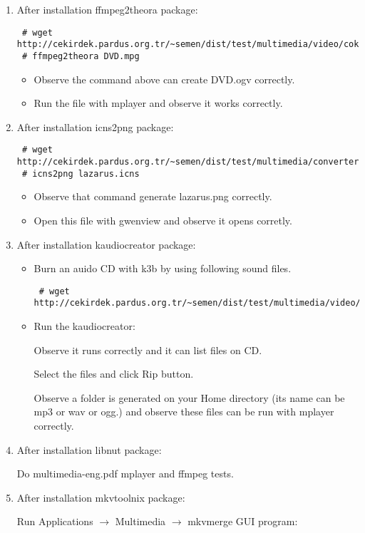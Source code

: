 \documentclass[a4paper,10pt]{article}
\begin{document}
\begin{enumerate}
\item After installation ffmpeg2theora package:
\begin{verbatim}
 # wget http://cekirdek.pardus.org.tr/~semen/dist/test/multimedia/video/cokluortam/DVD.mpg
 # ffmpeg2theora DVD.mpg
\end{verbatim}
\begin{itemize}
 \item Observe the command above can create DVD.ogv correctly.
 \item Run the file with mplayer and observe it works correctly.
\end{itemize}
\item After installation icns2png package:
\begin{verbatim}
 # wget http://cekirdek.pardus.org.tr/~semen/dist/test/multimedia/converter/lazarus.png
 # icns2png lazarus.icns
\end{verbatim}
\begin{itemize}
 \item Observe that command generate lazarus.png correctly.
 \item Open this file with gwenview and observe it opens corretly.
\end{itemize}
\item After installation kaudiocreator package:
\begin{itemize}
 \item Burn an auido CD with k3b by using following sound files.
\begin{verbatim}
 # wget http://cekirdek.pardus.org.tr/~semen/dist/test/multimedia/video/cokluortam/
\end{verbatim}
 \item Run the kaudiocreator:

Observe it runs correctly and it can list files on CD.

Select the files and click Rip button.

Observe a folder is generated on your Home directory (its name can be mp3 or wav or ogg.) and observe these files can be run with mplayer correctly.
\end{itemize}

\item After installation libnut package:

Do multimedia-eng.pdf mplayer and ffmpeg tests.

\item After installation mkvtoolnix package:

Run Applications $\rightarrow$ Multimedia $\rightarrow$ mkvmerge GUI program:


\end{enumerate}
\end{document}
